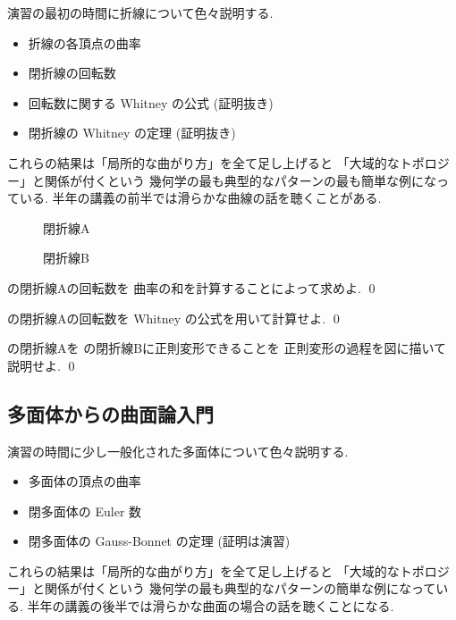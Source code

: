 \documentclass[12pt,twoside]{jarticle}
\begin{document}
演習の最初の時間に折線について色々説明する.
\begin{itemize}
\item 折線の各頂点の曲率
\item 閉折線の回転数
\item 回転数に関する Whitney の公式 (証明抜き)
\item 閉折線の Whitney の定理 (証明抜き)
\end{itemize}
これらの結果は「局所的な曲がり方」を全て足し上げると
「大域的なトポロジー」と関係が付くという
幾何学の最も典型的なパターンの最も簡単な例になっている.
半年の講義の前半では滑らかな曲線の話を聴くことがある.

\begin{figure}[htbp]
  \centering
  
  \caption{閉折線A}
  \label{fig:polyline01}
\end{figure}

\begin{figure}[htbp]
  \centering
  
  \caption{閉折線B}
  \label{fig:polyline02}
\end{figure}

\begin{question}
  の閉折線Aの回転数を
  曲率の和を計算することによって求めよ.
  \qed
\end{question}

\begin{question}
  の閉折線Aの回転数を
  Whitney の公式を用いて計算せよ.
  \qed
\end{question}

\begin{question}
  の閉折線Aを
  の閉折線Bに正則変形できることを
  正則変形の過程を図に描いて説明せよ.
  \qed
\end{question}


\subsection{多面体からの曲面論入門}
\label{sec:oresen}

演習の時間に少し一般化された多面体について色々説明する.
\begin{itemize}
\item 多面体の頂点の曲率
\item 閉多面体の Euler 数
\item 閉多面体の Gauss-Bonnet の定理 (証明は演習)
\end{itemize}
これらの結果は「局所的な曲がり方」を全て足し上げると
「大域的なトポロジー」と関係が付くという
幾何学の最も典型的なパターンの簡単な例になっている.
半年の講義の後半では滑らかな曲面の場合の話を聴くことになる.
\end{document}

